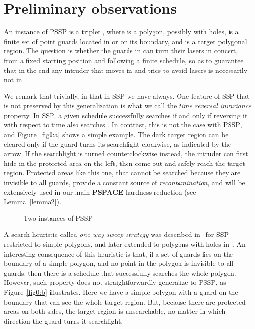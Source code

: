 \documentclass{style}
\newcommand{\complexityclass}[1]{\textbf{#1}}
\newcommand{\computproblem}[1]{\textsc{#1}}
\newcommand{\PSPACE}{\complexityclass{PSPACE}\xspace}
\newcommand{\SSP}{\computproblem{SSP}\xspace}
\newcommand{\PSSP}{\computproblem{PSSP}\xspace}
\begin{document}
\section{Preliminary observations}

An instance of \PSSP is a triplet , where  is a polygon, possibly with holes,  is a finite set of point guards located in  or on its boundary, and  is a target polygonal region. The question is whether the guards in  can turn their lasers in concert, from a fixed starting position and following a finite schedule, so as to guarantee that in the end any intruder that moves in  and tries to avoid lasers is necessarily not in .

We remark that  trivially, in that in \SSP we have  always. One feature of \SSP that is not preserved by this generalization is what we call the \emph{time reversal invariance} property. In \SSP, a given schedule successfully searches  if and only if reversing it with respect to time also searches . In contrast, this is not the case with \PSSP, and Figure~\ref{fig0:a} shows a simple example. The dark target region can be cleared only if the guard turns its searchlight clockwise, as indicated by the arrow. If the searchlight is turned counterclockwise instead, the intruder can first hide in the protected area on the left, then come out and safely reach the target region. Protected areas like this one, that cannot be searched because they are invisible to all guards, provide a constant source of \emph{recontamination}, and will be extensively used in our main \PSPACE-hardness reduction (see Lemma~\ref{lemma2}).

\begin{figure}[h]
\centering
{}\qquad\qquad\quad
{}
\caption{Two instances of \PSSP}
\label{fig0}
\end{figure}

A search heuristic called \emph{one-way sweep strategy} was described in~\cite{search} for \SSP restricted to simple polygons, and later extended to polygons with holes in~\cite{search2}. An interesting consequence of this heuristic is that, if a set of guards lies on the boundary of a simple polygon, and no point in the polygon is invisible to all guards, then there is a schedule that successfully searches the whole polygon. However, such property does not straightforwardly generalize to \PSSP, as Figure~\ref{fig0:b} illustrates. Here we have a simple polygon with a guard on the boundary that can see the whole target region. But, because there are protected areas on both sides, the target region is unsearchable, no matter in which direction the guard turns it searchlight.
\end{document}

